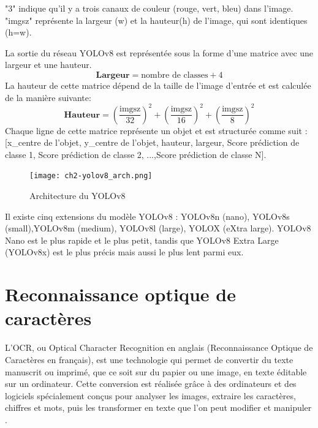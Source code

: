\begin{outline}
    \1 "3" indique qu'il y a trois canaux de couleur (rouge, vert, bleu) dans l'image.
    \1 "imgsz" représente la largeur (w) et la hauteur(h) de l'image, qui sont identiques (h=w).
\end{outline}
La sortie du réseau YOLOv8 est représentée sous la forme d'une matrice avec une largeur et une hauteur.
\begin{equation}
\textbf{Largeur} = \text{nombre de classes} + 4
\end{equation}
La hauteur de cette matrice dépend de la taille de l'image d'entrée et est calculée de la manière suivante:
\begin{equation}
\textbf{Hauteur} = 
\left(\frac{{\text{imgsz}}}{{32}}\right)^2 + \left(\frac{{\text{imgsz}}}{{16}}\right)^2 + \left(\frac{{\text{imgsz}}}{{8}}\right)^2
\end{equation}
Chaque ligne de cette matrice représente un objet et est structurée comme suit : [x\_centre de l'objet, y\_centre de l'objet, hauteur, largeur, Score prédiction de classe 1, Score prédiction de classe 2, ...,Score prédiction de classe  N].

\begin{figure}[H]
	\centering
	\texttt{[image: ch2-yolov8\_arch.png]}
	\caption{Architecture du YOLOv8}
    \label{fig:ch2-yolov8_arch}
\end{figure}

Il existe cinq extensions du modèle YOLOv8 : YOLOv8n (nano), YOLOv8s (small),YOLOv8m (medium), YOLOv8l (large), YOLOX (eXtra large). YOLOv8 Nano est le plus rapide et le plus petit, tandis que YOLOv8 Extra Large (YOLOv8x) est le plus précis mais aussi le plus lent parmi eux.



\section{Reconnaissance optique de caractères}

L'OCR, ou Optical Character Recognition en anglais (Reconnaissance Optique de Caractères en français), est une technologie qui permet de convertir du texte manuscrit ou imprimé, que ce soit sur du papier ou une image, en texte éditable sur un ordinateur. Cette conversion est réalisée grâce à des ordinateurs et des logiciels spécialement conçus pour analyser les images, extraire les caractères, chiffres et mots, puis les transformer en texte que l'on peut modifier et manipuler \cite{ch2_ocr_definitionxcs}.

